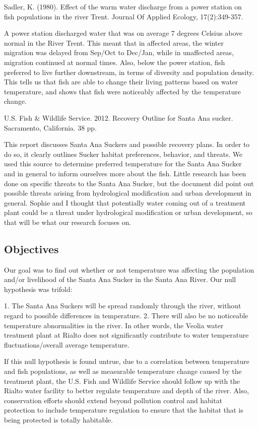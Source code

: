 \documentclass{article}
\begin{document}
Sadler, K. (1980). Effect of the warm water discharge from a power station on fish populations in the river Trent. Journal Of Applied Ecology, 17(2):349-357.

A power station discharged water that was on average 7 degrees Celsius above normal in the River Trent. This meant that in affected areas, the winter migration was delayed from Sep/Oct to Dec/Jan, while in unaffected areas, migration continued at normal times. Also, below the power station, fish preferred to live further downstream, in terms of diversity and population density. This tells us that fish are able to change their living patterns based on water temperature, and shows that fish were noticeably affected by the temperature change. 

U.S. Fish \& Wildlife Service. 2012. Recovery Outline for Santa Ana sucker. Sacramento, California. 38 pp.

This report discusses Santa Ana Suckers and possible recovery plans. In order to do so, it clearly outlines Sucker habitat preferences, behavior, and threats. We used this source to determine preferred temperature for the Santa Ana Sucker and in general to inform ourselves more about the fish. Little research has been done on specific threats to the Santa Ana Sucker, but the document did point out possible threats arising from hydrological modification and urban development in general. Sophie and I thought that potentially water coming out of a treatment plant could be a threat under hydrological modification or urban development, so that will be what our research focuses on.

\subsection{Objectives}

Our goal was to find out whether or not temperature was affecting the population and/or livelihood of the Santa Ana Sucker in the Santa Ana River. Our null hypothesis was trifold:


  1. The Santa Ana Suckers will be spread randomly through the river, without regard to possible differences in temperature. 
  2. There will also be no noticeable temperature abnormalities in the river. In other words, the Veolia water treatment plant at Rialto does not significantly contribute to water temperature fluctuations/overall average temperature. 


If this null hypothesis is found untrue, due to a correlation between temperature and fish populations, as well as measurable temperature change caused by the treatment plant, the U.S. Fish and Wildlife Service should follow up with the Rialto water facility to better regulate temperature and depth of the river. Also, conservation efforts should extend beyond pollution control and habitat protection to include temperature regulation to ensure that the habitat that is being protected is totally habitable.
\end{document}
